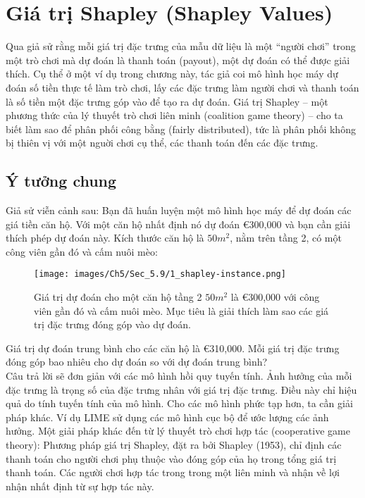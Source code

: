\section{ Giá trị Shapley (Shapley Values)}
Qua giả sử rằng mỗi giá trị đặc trưng của mẫu dữ liệu là một “người chơi” trong một trò chơi mà dự đoán là thanh toán (payout), một dự đoán có thể được giải thích. Cụ thể ở một ví dụ trong chương này, tác giả coi mô hình học máy dự đoán số tiền thực tế làm trò chơi, lấy các đặc trưng làm người chơi và thanh toán là số tiền một đặc trưng góp vào để tạo ra dự đoán. Giá trị Shapley – một phương thức của lý thuyết trò chơi liên minh (coalition game theory) – cho ta biết làm sao để phân phối công bằng (fairly distributed), tức là phân phối không bị thiên vị với một nguời chơi cụ thể, các thanh toán đến các đặc trưng.

\subsection{Ý tưởng chung}
Giả sử viễn cảnh sau:
Bạn đã huấn luyện một mô hình học máy để dự đoán các giá tiền căn hộ. Với một căn hộ nhất định nó dự đoán \euro 300,000 và bạn cần giải thích phép dự đoán này. Kích thước căn hộ là $50 m^2$, nằm trên tầng 2, có một công viên gần đó và cấm nuôi mèo:
\begin{figure*}[h!]
	\centering
	\texttt{[image: images/Ch5/Sec\_5.9/1\_shapley-instance.png]}
	\label{fig:5_43}
	\caption{ Giá trị dự đoán cho một căn hộ tầng 2 $50 m^2$ là \euro 300,000 với công viên gần đó và cấm nuôi mèo. Mục tiêu là giải thích làm sao các giá trị đặc trưng đóng góp vào dự đoán.}
\end{figure*}
Giá trị dự đoán trung bình cho các căn hộ là \euro 310,000. Mỗi giá trị đặc trưng đóng góp bao nhiêu cho dự đoán so với dự đoán trung bình?\\
Câu trả lời sẽ đơn giản với các mô hình hồi quy tuyến tính. Ảnh hưởng của mỗi đặc trưng là trọng số của đặc trưng nhân với giá trị đặc trưng. Điều này chỉ hiệu quả do tính tuyến tính của mô hình. Cho các mô hình phức tạp hơn, ta cần giải pháp khác. Ví dụ LIME sử dụng các mô hình cục bộ để ước lượng các ảnh hưởng. Một giải pháp khác đến từ lý thuyết trò chơi hợp tác (cooperative game theory): Phương pháp giá trị Shapley, đặt ra bởi Shapley (1953), chỉ định các thanh toán cho người chơi phụ thuộc vào đóng góp của họ trong tổng giá trị thanh toán. Các người chơi hợp tác trong trong một liên minh và nhận về lợi nhận nhất định từ sự hợp tác này.\\
